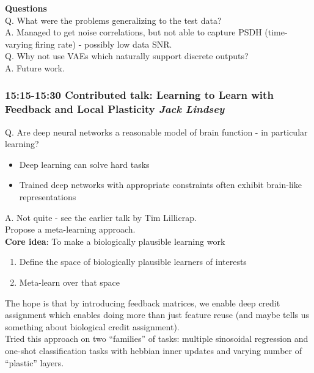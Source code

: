 \documentclass[12pt]{article}
\begin{document}
\textbf{Questions} \\

Q. What were the problems generalizing to the test data? \\

A. Managed to get noise correlations, but not able to capture PSDH (time-varying firing rate) - possibly low data SNR. \\

Q. Why not use VAEs which naturally support discrete outputs? \\

A. Future work.


\subsubsection{15:15-15:30 Contributed talk: Learning to Learn with Feedback and Local Plasticity \textit{Jack Lindsey}}

Q. Are deep neural networks a reasonable model of brain function - in particular learning?
\begin{itemize}
    \item Deep learning can solve hard tasks
    \item Trained deep networks with appropriate constraints often exhibit brain-like representations
\end{itemize}
A. Not quite - see the earlier talk by Tim Lillicrap. \\

Propose a meta-learning approach. \\

\textbf{Core idea}: To make a biologically plausible learning work 
\begin{enumerate}
    \item Define the space of biologically plausible learners of interests
    \item Meta-learn over that space
\end{enumerate}
The hope is that by introducing feedback matrices, we enable deep credit assignment which enables doing more than just feature reuse (and maybe tells us something about biological credit assignment). \\

Tried this approach on two ``families'' of tasks: multiple sinosoidal regression and one-shot classification tasks with hebbian inner updates and varying number of ``plastic'' layers. \\
\end{document}
